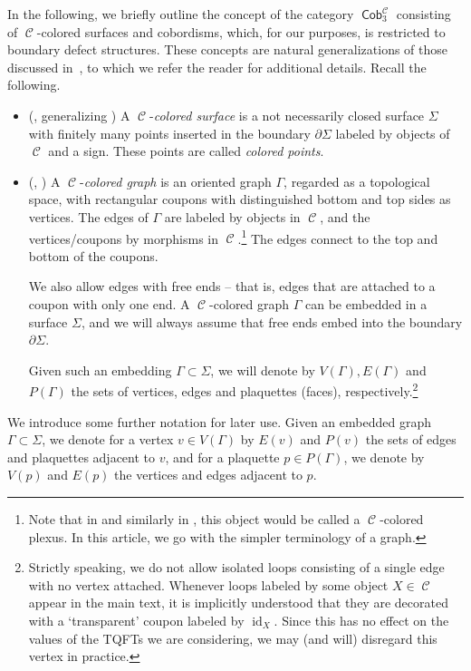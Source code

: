 \documentclass[10pt,a4paper]{amsart}
\DeclareMathOperator{\id}{id}
\DeclareMathOperator{\Cob}{\mathsf{Cob}}
\DeclareMathOperator{\calc}{\mathcal{C}}
\numberwithin{equation}{section}
\theoremstyle{definition}
\begin{document}
In the following, we briefly outline the concept of the category $\Cob_3^{\calc}$ consisting of $\calc$-colored surfaces and cobordisms, which, for our purposes, is restricted to boundary defect structures. These concepts are natural generalizations of those discussed in~\cite{TV}, to which we refer the reader for additional details. Recall the following.
\begin{itemize}\itemsep=0pt
 \item (\cite[Definition 4.2.5]{F}, generalizing \cite[Section 15.1.1]{TV}) A $\calc$-\textit{colored surface} is a not necessarily closed surface $\Sigma$ with finitely many points inserted in the boundary $\partial \Sigma$ labeled by objects of $\calc$ and a sign. These points are called \textit{colored points}.
 \item (\cite[Definition 4.2.7]{F}, \cite[Section 15.1.2]{TV}) A $\calc$-\textit{colored graph} is an oriented graph $\Gamma$, regarded as a topological space, with rectangular coupons with distinguished bottom and top sides as vertices. The edges of $\Gamma$ are labeled by objects in $\calc$, and the vertices/coupons by morphisms in $\calc$.\footnote{Note that in \cite{F} and similarly in \cite{TV}, this object would be called a $\calc$-colored plexus. In this article, we go with the simpler terminology of a graph.\label{footNoLoops}} The edges connect to the top and bottom of the coupons.

 We also allow edges with free ends -- that is, edges that are attached to a coupon with only one end. A $\calc$-colored graph $\Gamma$ can be embedded in a surface $\Sigma$, and we will always assume that free ends embed into the boundary $\partial \Sigma$.

 Given such an embedding $\Gamma \subset \Sigma$, we will denote by $V(\Gamma), E(\Gamma)$ and $P(\Gamma)$ the sets of vertices, edges and plaquettes (faces), respectively.\footnote{Strictly speaking, we do not allow isolated loops consisting of a single edge with no vertex attached. Whenever loops labeled by some object $X \in \calc$ appear in the main text, it is implicitly understood that they are decorated with a `transparent' coupon labeled by $\id_X$. Since this has no effect on the values of the TQFTs we are considering, we may (and will) disregard this vertex in practice.}
\end{itemize}
We introduce some further notation for later use. Given an embedded graph $\Gamma \subset \Sigma$, we denote for a vertex $v \in V(\Gamma)$ by $E(v)$ and $P(v)$ the sets of edges and plaquettes adjacent to $v$, and for a plaquette $p \in P(\Gamma)$, we denote by $V(p)$ and $E(p)$ the vertices and edges adjacent to $p$.
\end{document}
